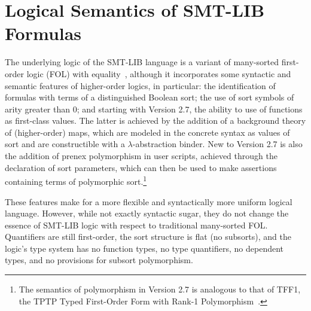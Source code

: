 



\chapter{Logical Semantics of SMT-LIB Formulas} \label{chap:logical-semantics}
\thispagestyle{empty}

The underlying logic of the SMT-LIB language is a variant of many-sorted 
first-order logic (FOL) with equality~\cite{Man-MSL-93,Gal-86,Hen-01},
although it incorporates some syntactic and semantic features 
of higher-order logics, in particular: 
the identification of formulas with terms of a distinguished Boolean sort;
the use of sort symbols of arity greater than 0;
and starting with Version 2.7, the ability to use of functions as first-class values.
The latter is achieved by the addition of a background theory of (higher-order) maps,
which are modeled in the concrete syntax as values 
of sort 
and are constructible with a $\lambda$-abstraction binder.
New to Version 2.7 is also the addition of prenex polymorphism in user scripts,
achieved through the declaration of sort parameters, which can then 
be used to make assertions containing terms of polymorphic sort.\footnote{
The semantics of polymorphism in Version 2.7 is analogous to that of TFF1, the TPTP Typed First-Order Form with Rank-1 Polymorphism~\cite{BlanchetteP13}.
}

These features make for a more flexible and syntactically more uniform 
logical language.
However, while not exactly syntactic sugar, they do not change the essence 
of SMT-LIB logic with respect to traditional many-sorted FOL.
Quantifiers are still first-order, the sort structure is flat (no subsorts),
and the logic's type system has no function types, 
no type quantifiers, no dependent types, and
no provisions for subsort polymorphism.

